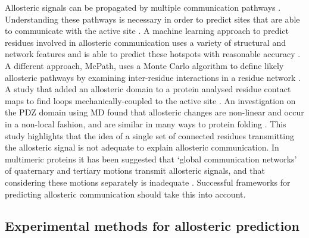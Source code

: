 Allosteric signals can be propagated by multiple communication pathways \cite{DelSol2009}.
Understanding these pathways is necessary in order to predict sites that are able to communicate with the active site \cite{Dokholyan2016}.
A machine learning approach to predict residues involved in allosteric communication uses a variety of structural and network features and is able to predict these hotspots with reasonable accuracy \cite{Demerdash2009}.
A different approach, McPath, uses a Monte Carlo algorithm to define likely allosteric pathways by examining inter-residue interactions in a residue network \cite{Kaya2013}.
A study that added an allosteric domain to a protein analysed residue contact maps to find loops mechanically-coupled to the active site \cite{Dagliyan2016}.
An investigation on the PDZ domain using MD found that allosteric changes are non-linear and occur in a non-local fashion, and are similar in many ways to protein folding \cite{Buchenberg2017}.
This study highlights that the idea of a single set of connected residues transmitting the allosteric signal is not adequate to explain allosteric communication.
In multimeric proteins it has been suggested that `global communication networks' of quaternary and tertiary motions transmit allosteric signals, and that considering these motions separately is inadequate \cite{Daily2009}.
Successful frameworks for predicting allosteric communication should take this into account.


\subsection{Experimental methods for allosteric prediction}

